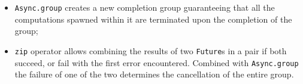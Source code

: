 \documentclass[aspectratio=169,xcolor=dvipsnames]{beamer}
\begin{document}
%     


\begin{frame}
    
    \fontsize{8}{10}
    \begin{itemize}
        \item \texttt{Async.group} creates a new completion group guaranteeing that all the computations spawned within it are terminated upon the completion of the group;
        \item \texttt{zip} operator allows combining the results of two \texttt{Future}s in a pair if both succeed, or fail with the first error encountered. Combined with \texttt{Async.group} the failure of one of the two determines the cancellation of the entire group.
    \end{itemize}
\end{frame}

\end{document}
